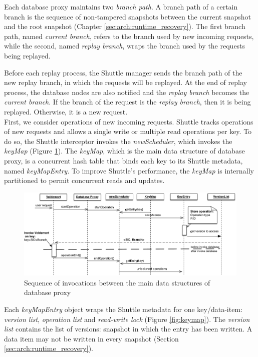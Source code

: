 Each database proxy maintains two \emph{branch path}. A branch path of a certain branch is the sequence of non-tampered snapshots between the current snapshot and the root snapshot (Chapter \ref{sec:arch:runtime_recovery}). The first branch path, named \textit{current branch}, refers to the branch used by new incoming requests, while the second, named \textit{replay branch}, wraps the branch used by the requests being replayed.

Before each replay process, the Shuttle manager sends the branch path of the new replay branch, in which the requests will be replayed. At the end of replay process, the database nodes are also notified and the \textit{replay branch} becomes the \textit{current branch}. If the branch of the request is the \textit{replay branch}, then it is being replayed. Otherwise, it is a new request.\\


First, we consider operations of new incoming requests. Shuttle tracks operations of new requests and allows a single write or multiple read operations per key. To do so, the Shuttle interceptor invokes the \emph{newScheduler}, which invokes the \emph{keyMap} (Figure \ref{fig:sequence_normal}). The \emph{keyMap}, which is the main data structure of database proxy, is a concurrent hash table that binds each  key to its Shuttle metadata, named \emph{keyMapEntry}. To improve Shuttle's performance, the \emph{keyMap} is internally partitioned to permit concurrent reads and updates.

\begin{figure}
  \centering
  \includegraphics[width=\textwidth]{arch/operation_database}
  \caption{Sequence of invocations between the main data structures of database proxy }
  \label{fig:sequence_normal}
\end{figure}


Each \emph{keyMapEntry} object wraps the Shuttle metadata for one key/data-item: \emph{version list}, \emph{operation list} and \emph{read-write lock} (Figure \ref{fig:keymap}). The \emph{version list} contains the list of versions: snapshot in which the entry has been written. A data item may not be written in every snapshot (Section \ref{sec:arch:runtime_recovery}). 

